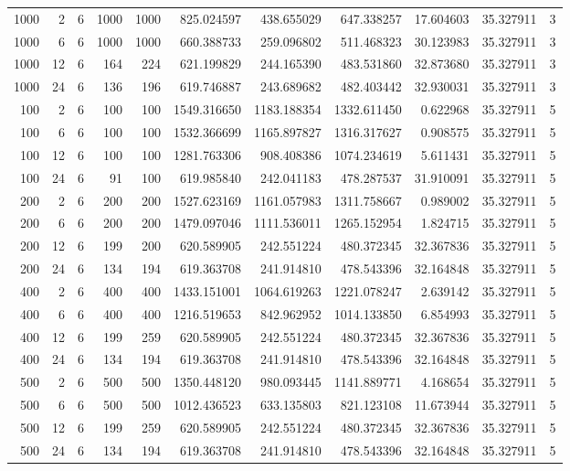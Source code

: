 \begin{table}
\begin{tabular}{rrrrrrrrrrr}
1000 & 2 & 6 & 1000 & 1000 & 825.024597 & 438.655029 & 647.338257 & 17.604603 & 35.327911 & 3 \\
1000 & 6 & 6 & 1000 & 1000 & 660.388733 & 259.096802 & 511.468323 & 30.123983 & 35.327911 & 3 \\
1000 & 12 & 6 & 164 & 224 & 621.199829 & 244.165390 & 483.531860 & 32.873680 & 35.327911 & 3 \\
1000 & 24 & 6 & 136 & 196 & 619.746887 & 243.689682 & 482.403442 & 32.930031 & 35.327911 & 3 \\
100 & 2 & 6 & 100 & 100 & 1549.316650 & 1183.188354 & 1332.611450 & 0.622968 & 35.327911 & 5 \\
100 & 6 & 6 & 100 & 100 & 1532.366699 & 1165.897827 & 1316.317627 & 0.908575 & 35.327911 & 5 \\
100 & 12 & 6 & 100 & 100 & 1281.763306 & 908.408386 & 1074.234619 & 5.611431 & 35.327911 & 5 \\
100 & 24 & 6 & 91 & 100 & 619.985840 & 242.041183 & 478.287537 & 31.910091 & 35.327911 & 5 \\
200 & 2 & 6 & 200 & 200 & 1527.623169 & 1161.057983 & 1311.758667 & 0.989002 & 35.327911 & 5 \\
200 & 6 & 6 & 200 & 200 & 1479.097046 & 1111.536011 & 1265.152954 & 1.824715 & 35.327911 & 5 \\
200 & 12 & 6 & 199 & 200 & 620.589905 & 242.551224 & 480.372345 & 32.367836 & 35.327911 & 5 \\
200 & 24 & 6 & 134 & 194 & 619.363708 & 241.914810 & 478.543396 & 32.164848 & 35.327911 & 5 \\
400 & 2 & 6 & 400 & 400 & 1433.151001 & 1064.619263 & 1221.078247 & 2.639142 & 35.327911 & 5 \\
400 & 6 & 6 & 400 & 400 & 1216.519653 & 842.962952 & 1014.133850 & 6.854993 & 35.327911 & 5 \\
400 & 12 & 6 & 199 & 259 & 620.589905 & 242.551224 & 480.372345 & 32.367836 & 35.327911 & 5 \\
400 & 24 & 6 & 134 & 194 & 619.363708 & 241.914810 & 478.543396 & 32.164848 & 35.327911 & 5 \\
500 & 2 & 6 & 500 & 500 & 1350.448120 & 980.093445 & 1141.889771 & 4.168654 & 35.327911 & 5 \\
500 & 6 & 6 & 500 & 500 & 1012.436523 & 633.135803 & 821.123108 & 11.673944 & 35.327911 & 5 \\
500 & 12 & 6 & 199 & 259 & 620.589905 & 242.551224 & 480.372345 & 32.367836 & 35.327911 & 5 \\
500 & 24 & 6 & 134 & 194 & 619.363708 & 241.914810 & 478.543396 & 32.164848 & 35.327911 & 5 \\

\end{tabular}
\end{table}
